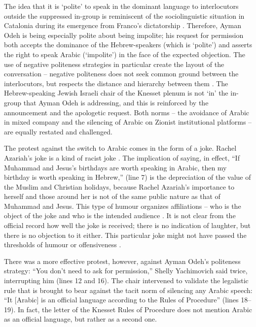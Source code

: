 \documentclass[output=paper,arabicfont]{langscibook}
\begin{document}
The idea that it is ‘polite' to speak in the dominant language to interlocutors outside the suppressed in-group is reminiscent of the sociolinguistic situation in Catalonia during its emergence from Franco’s dictatorship \citep{woolard2012a}. Therefore, Ayman Odeh is being especially polite about being impolite; his request for permission both accepts the dominance of the Hebrew-speakers (which is ‘polite') and asserts the right to speak Arabic (‘impolite') in the face of the expected objection. The use of negative politeness strategies in particular create the layout of the conversation – negative politeness does not seek common ground between the interlocutors, but respects the distance and hierarchy between them \citep[25–29]{eelen2001a}. The Hebrew-speaking Jewish Israeli chair of the Knesset plenum is not ‘in' the in-group that Ayman Odeh is addressing, and this is reinforced by the announcement and the apologetic request. Both norms – the avoidance of Arabic in mixed company and the silencing of Arabic on Zionist institutional platforms – are equally restated and challenged.

The protest against the switch to Arabic comes in the form of a joke. Rachel Azariah’s joke is a kind of racist joke \citep{weaver2016a}. The implication of saying, in effect, “If Muhammad and Jesus’s birthdays are worth speaking in Arabic, then my birthday is worth speaking in Hebrew,” (line 7) is the depreciation of the value of the Muslim and Christian holidays, because Rachel Azariah’s importance to herself and those around her is not of the same public nature as that of Muhammad and Jesus. This type of humour organizes affiliations – who is the object of the joke and who is the intended audience \citep{meyer2000a}. It is not clear from the official record how well the joke is received; there is no indication of laughter, but there is no objection to it either. This particular joke might not have passed the thresholds of humour or offensiveness \citep{kuipers2016a}.

There was a more effective protest, however, against Ayman Odeh’s politeness strategy: “You don’t need to ask for permission,” Shelly Yachimovich said twice, interrupting him (lines 12 and 16). The chair intervened to validate the legalistic rule that is brought to bear against the tacit norm of silencing any Arabic speech: “It [Arabic] is an official language according to the Rules of Procedure” (lines 18–19). In fact, the letter of the Knesset Rules of Procedure does not mention Arabic as an official language, but rather as a second one. 
\end{document}
